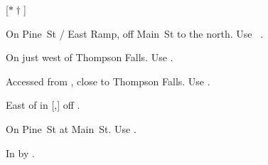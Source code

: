 
[$\ast\dagger$]

\begin{LocationList}

On Pine~St / East Ramp, off  Main~St to the north.
Use~ .

On  just west of Thompson Falls.
Use  .

Accessed from , close to Thompson Falls.
Use  .

East of  in [,] off  .



On Pine~St at  Main~St.
Use  .

\Location{\TruckStop \Gas \Rest}
In  by  .

\end{LocationList}
